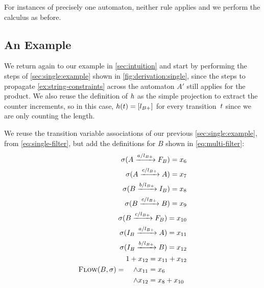 \iffalse
Note that this definition implies that $\Filter(\Transition) =
\Filter(\Transition')$ whenever two transitions $\Transition \in
\Transitions_{\Automaton_1}, \Transition' \in \Transitions_{\Automaton_2}$
produces a product transition $\Transition'' \in \Transitions_{\Automaton_1
\times \Automaton_2}$. This corresponds to our intuition that the terms of the
product must agree on the value they accept. As before, we implicitly map
$\Filter$ to fresh terms for each transition in the product.
\fi

For instances of precisely one automaton, neither rule applies and we
perform the calculus as before.

\subsection{An Example}\label{sec:multiple:example}

We return again to our example in \cref{sec:intuition} and start by performing
the steps of \cref{sec:single:example} shown in \cref{fig:derivation:single},
since the steps to propagate \cref{ex:string-constraints} across the automaton
$A'$ still applies for the product. We also reuse the definition of $h$ as
the simple projection to extract the counter increments, so in this case,
$h(t) = \left[l_{B+}\right]$ for every transition~$t$
since we are only counting the length.

We reuse the transition variable associations of our previous
\cref{sec:single:example}, from \cref{eq:single-filter}, but add the definitions
for $B$ shown in \cref{eq:multi-filter}:
\begin{equation}\label{eq:multi-filter}
    \begin{aligned}
        \operatorname{\sigma}(A \xrightarrow{a / l_{B+}} F_B ) = x_6\\
        \operatorname{\sigma}(A \xrightarrow{c / l_{B+}} A ) = x_7\\
        \operatorname{\sigma}(B \xrightarrow{b / l_{B+}} I_B)= x_8 \\
        \operatorname{\sigma}(B \xrightarrow{c / l_{B+}} B)= x_9\\
        \operatorname{\sigma}(B \xrightarrow{c / l_{B+}} F_B)= x_{10}\\
        \operatorname{\sigma}(I_B \xrightarrow{a / l_{B+}} A)= x_{11}\\
        \operatorname{\sigma}(I_B \xrightarrow{b / l_{B+}} B)= x_{12}\\
        \textsc{Flow}(B, \operatorname{\sigma}) =  \begin{aligned}
            1 + x_{12}   &= x_{11} + x_{12}\\
            \land x_{11} &= x_6\\
            \land x_{12} &= x_8 + x_{10}
        \end{aligned}
    \end{aligned}
\end{equation}
    
